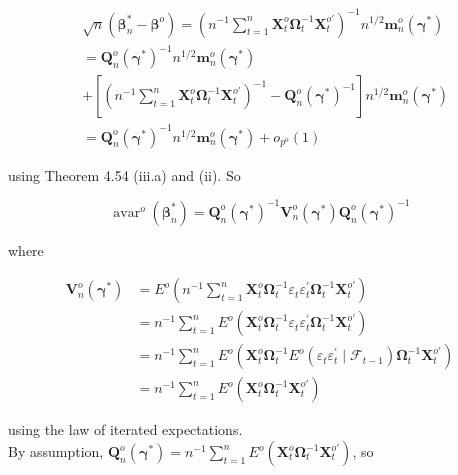 \documentclass[10pt]{article}
\begin{document}
$$
\begin{aligned}
& \sqrt{n}\left(\boldsymbol{\beta}_{n}^{*}-\boldsymbol{\beta}^{o}\right)=\left(n^{-1} \sum_{t=1}^{n} \mathbf{X}_{t}^{o} \boldsymbol{\Omega}_{t}^{-1} \mathbf{X}_{t}^{o \prime}\right)^{-1} n^{1 / 2} \mathbf{m}_{n}^{o}\left(\boldsymbol{\gamma}^{*}\right) \\
& =\mathbf{Q}_{n}^{o}\left(\boldsymbol{\gamma}^{*}\right)^{-1} n^{1 / 2} \mathbf{m}_{n}^{o}\left(\boldsymbol{\gamma}^{*}\right) \\
& +\left[\left(n^{-1} \sum_{t=1}^{n} \mathbf{X}_{t}^{o} \boldsymbol{\Omega}_{t}^{-1} \mathbf{X}_{t}^{o \prime}\right)^{-1}-\mathbf{Q}_{n}^{o}\left(\boldsymbol{\gamma}^{*}\right)^{-1}\right] n^{1 / 2} \mathbf{m}_{n}^{o}\left(\boldsymbol{\gamma}^{*}\right) \\
& =\mathbf{Q}_{n}^{o}\left(\boldsymbol{\gamma}^{*}\right)^{-1} n^{1 / 2} \mathbf{m}_{n}^{o}\left(\boldsymbol{\gamma}^{*}\right)+o_{p^{o}}(1)
\end{aligned}
$$

using Theorem 4.54 (iii.a) and (ii). So

$$
\operatorname{avar}^{o}\left(\boldsymbol{\beta}_{n}^{*}\right)=\mathbf{Q}_{n}^{o}\left(\boldsymbol{\gamma}^{*}\right)^{-1} \mathbf{V}_{n}^{o}\left(\boldsymbol{\gamma}^{*}\right) \mathbf{Q}_{n}^{o}\left(\boldsymbol{\gamma}^{*}\right)^{-1}
$$

where

$$
\begin{aligned}
\mathbf{V}_{n}^{o}\left(\boldsymbol{\gamma}^{*}\right) & =E^{o}\left(n^{-1} \sum_{t=1}^{n} \mathbf{X}_{t}^{o} \boldsymbol{\Omega}_{t}^{-1} \varepsilon_{t} \varepsilon_{t}^{\prime} \boldsymbol{\Omega}_{t}^{-1} \mathbf{X}_{t}^{o \prime}\right) \\
& =n^{-1} \sum_{t=1}^{n} E^{o}\left(\mathbf{X}_{t}^{o} \boldsymbol{\Omega}_{t}^{-1} \varepsilon_{t} \varepsilon_{t}^{\prime} \boldsymbol{\Omega}_{t}^{-1} \mathbf{X}_{t}^{o \prime}\right) \\
& =n^{-1} \sum_{t=1}^{n} E^{o}\left(\mathbf{X}_{t}^{o} \boldsymbol{\Omega}_{t}^{-1} E^{o}\left(\varepsilon_{t} \varepsilon_{t}^{\prime} \mid \mathcal{F}_{t-1}\right) \boldsymbol{\Omega}_{t}^{-1} \mathbf{X}_{t}^{o \prime}\right) \\
& =n^{-1} \sum_{t=1}^{n} E^{o}\left(\mathbf{X}_{t}^{o} \boldsymbol{\Omega}_{t}^{-1} \mathbf{X}_{t}^{o \prime}\right)
\end{aligned}
$$

using the law of iterated expectations.\\
By assumption, $\mathbf{Q}_{n}^{o}\left(\boldsymbol{\gamma}^{*}\right)=n^{-1} \sum_{t=1}^{n} E^{o}\left(\mathbf{X}_{t}^{o} \boldsymbol{\Omega}_{t}^{-1} \mathbf{X}_{t}^{o \prime}\right)$, so
\end{document}
